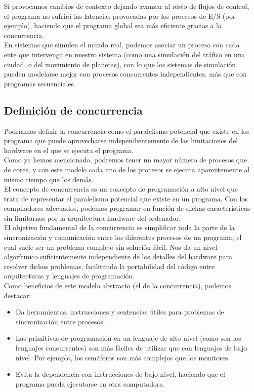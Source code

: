 Si provocamos cambios de contexto dejando avanzar al resto de flujos de control, el programa no sufrirá las latencias provocadas por los procesos de E/S (por ejemplo), haciendo que el programa global sea más eficiente gracias a la concurrencia.\\

En sistemas que simulen el mundo real, podemos asociar un proceso con cada ente que intervenga en nuestro sistema (como una simulación del tráfico en una ciudad, o del movimiento de planetas), con lo que los sistemas de simulación pueden modelarse mejor con procesos concurrentes independientes, más que con programas secuenciales.

\subsection{Definición de concurrencia}
Podríamos definir la concurrencia como el paralelismo potencial que existe en los programa que puede aprovecharse independientemente de las limitaciones del hardware en el que se ejecuta el programa.\\

Como ya hemos mencionado, podremos tener un mayor número de procesos que de cores, y con este modelo cada uno de los procesos se ejecuta aparentemente al mismo tiempo que los demás.\\

El concepto de concurrencia es un concepto de programación a alto nivel que trata de representar el paralelismo potencial que existe en un programa. Con los compiladores adecuados, podemos programar en función de dichas características sin limitarnos por la arquitectura hardware del ordenador.\\

El objetivo fundamental de la concurrencia es simplificar toda la parte de la sincronización y comunicación entre los diferentes procesos de un programa, el cual suele ser un problema complejo sin solución fácil. Nos da un nivel algorítmico suficientemente independiente de los detalles del hardware para resolver dichos problemas, facilitando la portabilidad del código entre arquitecturas y lenguajes de programación.\\

\noindent
Como beneficios de este modelo abstracto (el de la concurrencia), podemos destacar:
\begin{itemize}
    \item Da herramientas, instrucciones y sentencias útiles para problemas de sincronización entre procesos.
    \item Las primitivas de programación en un lenguaje de alto nivel (como son los lenguajes concurrentes) son más fáciles de utilizar que con lenguajes de bajo nivel. Por ejemplo, los semáforos son más complejos que los monitores.
    \item Evita la dependencia con instrucciones de bajo nivel, haciendo que el programa pueda ejecutarse en otra computadora.
\end{itemize}

